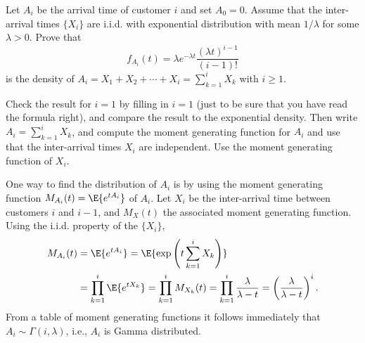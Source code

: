   \begin{exercise}
 Let $A_i$ be the arrival time of customer $i$ and set $A_0=0$.
    Assume that the inter-arrival times $\{X_i\}$ are i.i.d.  with
    exponential distribution with mean $1/\lambda$ for some
    $\lambda>0$.  Prove that
\begin{equation*}
f_{A_i}(t) = \lambda e^{-\lambda t} \frac{(\lambda t)^{i-1}}{(i-1)!}
\end{equation*}
is  the density of $A_i=X_1+X_2+\cdots+X_i=\sum_{k=1}^i X_k$ with $i\geq 1$. 
\begin{hint}
 Check the result for $i=1$ by filling in $i=1$ (just to be
     sure that you have read the formula right), and compare the result
     to the exponential density. Then write $A_i =\sum_{k=1}^i X_k$, and compute the moment
     generating function for $A_i$ and use that the inter-arrival times
     $X_i$ are independent. Use the moment generating function  of $X_i$.
\end{hint}
\begin{solution}
 One way to find the distribution of $A_i$ is by using the
    moment generating function $M_{A_i}(t) = \E{e^{t A_i}}$ of
    $A_i$. Let $X_i$ be the inter-arrival time between customers $i$
    and $i-1$, and $M_X(t)$ the associated moment generating
    function. Using the i.i.d. property of the $\{X_i\}$,
\begin{align*}
  M_{A_i}(t) &= \E{e^{t A_i}} = \E{\exp\left(t\sum_{k=1}^{i} X_k\right)} \\
& = \prod_{k=1}^{i} \E{e^{tX_k}} = 
\prod_{k=1}^{i} M_{X_k}(t) = 
\prod_{k=1}^{i} \frac{\lambda}{\lambda -t }
 = \left(\frac{\lambda}{\lambda -t }\right)^i.
\end{align*}
From a table of moment generating functions it follows immediately that
$A_i \sim \Gamma(i,\lambda)$, i.e., $A_i$ is Gamma distributed.
\end{solution}
\end{exercise}

